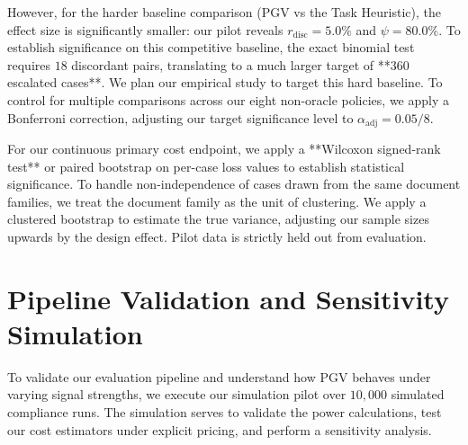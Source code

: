 \documentclass[manuscript,screen,nonacm]{acmart}
\newcommand{\PilotDiscHard}{5.0}
\newcommand{\PilotPsiHard}{80.0}
\newcommand{\PilotRequiredCasesHard}{360}
\newcommand{\PilotDiscordantRequiredHard}{18}
\begin{document}
However, for the harder baseline comparison (PGV vs the Task Heuristic), the effect size is significantly smaller: our pilot reveals $r_{\text{disc}} = \PilotDiscHard\%$ and $\psi = \PilotPsiHard\%$. To establish significance on this competitive baseline, the exact binomial test requires $\PilotDiscordantRequiredHard$ discordant pairs, translating to a much larger target of **$\PilotRequiredCasesHard$ escalated cases**. We plan our empirical study to target this hard baseline. To control for multiple comparisons across our eight non-oracle policies, we apply a Bonferroni correction, adjusting our target significance level to $\alpha_{\text{adj}} = 0.05/8$.

For our continuous primary cost endpoint, we apply a **Wilcoxon signed-rank test** or paired bootstrap on per-case loss values to establish statistical significance. To handle non-independence of cases drawn from the same document families, we treat the document family as the unit of clustering. We apply a clustered bootstrap to estimate the true variance, adjusting our sample sizes upwards by the design effect. Pilot data is strictly held out from evaluation.

\section{Pipeline Validation and Sensitivity Simulation}
\label{sec:results}

To validate our evaluation pipeline and understand how PGV behaves under varying signal strengths, we execute our simulation pilot over $10,000$ simulated compliance runs. The simulation serves to validate the power calculations, test our cost estimators under explicit pricing, and perform a sensitivity analysis.
\end{document}
